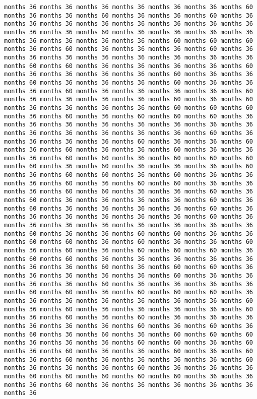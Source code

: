 \documentclass[11pt]{article}
\begin{document}
\begin{Verbatim}[commandchars=\\\{\}, frame=single, framerule=2mm, rulecolor=\color{outerrorbackground}]
months 36 months 36 months 36 months 36 months 36 months 36 months 60 months 36 months 36 months 60 months 36 months 36 months 60 months 36 months 36 months 36 months 36 months 36 months 36 months 36 months 36 months 36 months 36 months 60 months 36 months 36 months 36 months 36 months 36 months 36 months 36 months 36 months 60 months 60 months 60 months 36 months 60 months 36 months 36 months 36 months 60 months 36 months 36 months 36 months 36 months 36 months 36 months 36 months 36 months 60 months 60 months 36 months 36 months 36 months 36 months 60 months 36 months 36 months 36 months 36 months 60 months 36 months 36 months 60 months 36 months 36 months 36 months 60 months 36 months 36 months 36 months 60 months 36 months 36 months 36 months 36 months 60 months 36 months 36 months 36 months 36 months 60 months 36 months 60 months 36 months 36 months 36 months 36 months 60 months 60 months 60 months 36 months 60 months 36 months 60 months 60 months 60 months 36 months 36 months 36 months 36 months 36 months 36 months 36 months 36 months 36 months 36 months 36 months 36 months 36 months 60 months 36 months 36 months 36 months 36 months 60 months 36 months 36 months 60 months 36 months 60 months 36 months 36 months 60 months 36 months 36 months 36 months 60 months 60 months 36 months 60 months 60 months 60 months 60 months 36 months 60 months 36 months 36 months 36 months 60 months 36 months 60 months 60 months 36 months 60 months 36 months 36 months 36 months 60 months 36 months 60 months 60 months 36 months 36 months 36 months 60 months 60 months 36 months 36 months 60 months 36 months 60 months 36 months 36 months 36 months 36 months 60 months 36 months 60 months 36 months 36 months 36 months 36 months 60 months 36 months 36 months 36 months 36 months 36 months 36 months 60 months 36 months 36 months 36 months 36 months 36 months 36 months 36 months 36 months 60 months 36 months 36 months 60 months 60 months 36 months 36 months 60 months 60 months 36 months 60 months 36 months 36 months 60 months 36 months 60 months 36 months 60 months 60 months 60 months 36 months 60 months 60 months 36 months 36 months 36 months 36 months 36 months 36 months 36 months 60 months 36 months 60 months 60 months 36 months 36 months 36 months 36 months 36 months 60 months 36 months 36 months 36 months 36 months 60 months 36 months 36 months 36 months 36 months 60 months 60 months 36 months 60 months 60 months 60 months 36 months 36 months 36 months 36 months 36 months 36 months 36 months 60 months 36 months 60 months 36 months 36 months 36 months 36 months 60 months 36 months 60 months 36 months 60 months 36 months 36 months 36 months 36 months 36 months 36 months 60 months 36 months 60 months 36 months 60 months 36 months 60 months 36 months 60 months 60 months 60 months 36 months 36 months 36 months 60 months 60 months 36 months 60 months 36 months 60 months 36 months 36 months 60 months 36 months 60 months 36 months 60 months 36 months 36 months 36 months 36 months 60 months 36 months 36 months 36 months 60 months 36 months 36 months 36 months 60 months 60 months 60 months 60 months 60 months 36 months 36 months 36 months 60 months 36 months 36 months 36 months 36 months 36 months 36 
\end{Verbatim}
\end{document}
